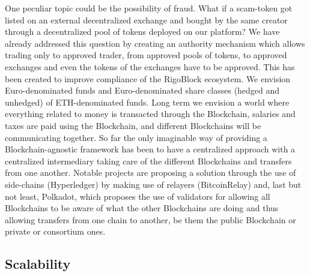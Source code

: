 \documentclass[9pt,oneside]{amsart}
\begin{document}
\begin{multicols}{2}
One peculiar topic could be the possibility of fraud. What if a scam-token got listed on an external decentralized exchange and bought by the same creator through a decentralized pool of tokens deployed on our platform? We have already addressed this question by creating an authority mechanism which allows trading only to approved trader, from approved pools of tokens, to approved exchanges and even the tokens of the exchanges have to be approved. This has been created to improve compliance of the RigoBlock ecosystem.
We envision Euro-denominated funds and Euro-denominated share classes (hedged and unhedged) of ETH-denominated funds. Long term we envision a world where everything related to money is transacted through the Blockchain, salaries and taxes are paid using the Blockchain, and different Blockchains will be communicating together. So far the only imaginable way of providing a Blockchain-agnostic framework has been to have a centralized approach with a centralized intermediary taking care of the different Blockchains and transfers from one another. Notable projects are proposing a solution through the use of side-chains (Hyperledger) by making use of relayers (BitcoinRelay) and, last but not least, Polkadot, which proposes the use of validators for allowing all Blockchains to be aware of what the other Blockchains are doing and thus allowing transfers from one chain to another, be them the public Blockchain or private or consortium ones.

\subsection{Scalability}


\end{multicols}
\end{document}
